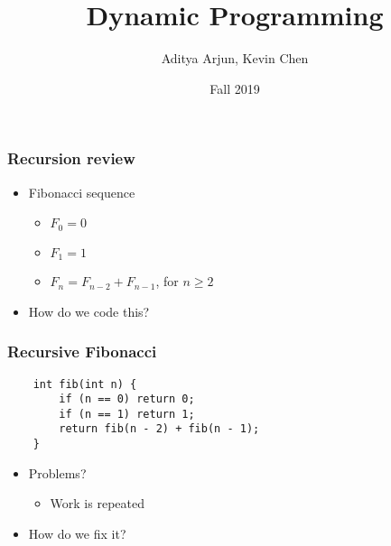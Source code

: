 \documentclass[t]{beamer}
\title{Dynamic Programming}
\author{Aditya Arjun, Kevin Chen}
\institute{CS 104C}
\date{Fall 2019}
\begin{document}
 
\frame{\titlepage}
 
\begin{frame}

    \frametitle{Recursion review}

    \begin{itemize}

        \item

        Fibonacci sequence

        \begin{itemize}

            \item $F_0 = 0$
            \item $F_1 = 1$
            \item $F_n = F_{n-2} + F_{n-1}$, for $n \geq 2$

        \end{itemize}

        \pause

        \item

        How do we code this?

    \end{itemize}

\end{frame}

\begin{frame}[fragile]

    \frametitle{Recursive Fibonacci}

    \begin{verbatim}
    int fib(int n) {
        if (n == 0) return 0;
        if (n == 1) return 1;
        return fib(n - 2) + fib(n - 1);
    }
    \end{verbatim}

    \pause

    \begin{itemize}

        \item

        Problems?

        \pause

        \begin{itemize}

            \item

            Work is repeated

        \end{itemize}

        \pause

        \item

        How do we fix it?

    \end{itemize}

\end{frame}
\end{document}
